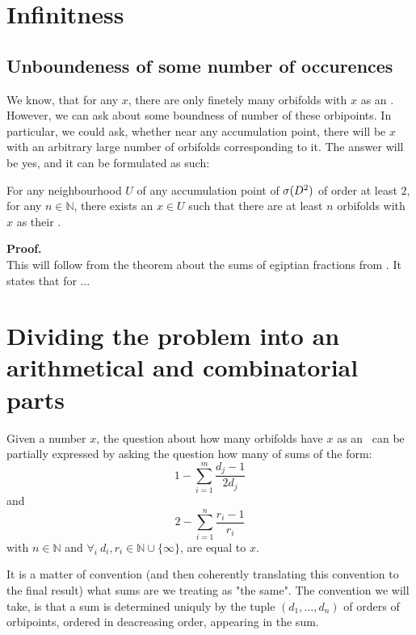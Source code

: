 \section{Infinitness}
\subsection{Unboundeness of some number of occurences}
We know, that for any $x$, there are only finetely many orbifolds with $x$ as an \Eoc . 
However, we can ask about some boundness of number of these orbipoints. 
In particular, we could ask, whether near any accumulation point, there will be $x$ with an 
arbitrary large number of orbifolds corresponding to it. 
The answer will be yes, and it can be formulated as such:
\begin{theorem}\label{unboundness}
For any neighbourhood $U$ of any accumulation point of ${{\sigma}(D^2)}$ of order at least $2$, for any 
$n\in \mathbb{N}$, 
there exists an $x\in U$ such that there are at least $n$ orbifolds with $x$ as their 
\Eoc.
\end{theorem}
\textbf{Proof.}\\
This will follow from the theorem about the sums of egiptian fractions from \cite{Browning2011}.
It states that for ...




\section{Dividing the problem into an arithmetical and combinatorial parts}

Given a number $x$, the question about how many orbifolds have $x$ as an \Eoc\ can be 
partially expressed by asking the question how many of sums of the form:
\begin{equation}\label{counting D2}
1-\sum_{i=1}^m \frac{d_j-1}{2d_j} 
\end{equation} 
and
\begin{equation}\label{counting S2}
2-\sum_{i=1}^n \frac{r_i-1}{r_i}
\end{equation}
with $n\in \mathbb{N}$ and $\forall_i\ d_i,r_i\in\mathbb{N}\cup\{\infty\}$, are equal to $x$. 

It is a matter of convention (and then coherently translating this convention to the final result) 
what sums are we treating as "the same". The convention we will take, is that a sum is determined 
uniquly by the tuple $(d_1,\dots,d_n)$  of orders 
of orbipoints, ordered in deacreasing order, appearing in the sum. 

